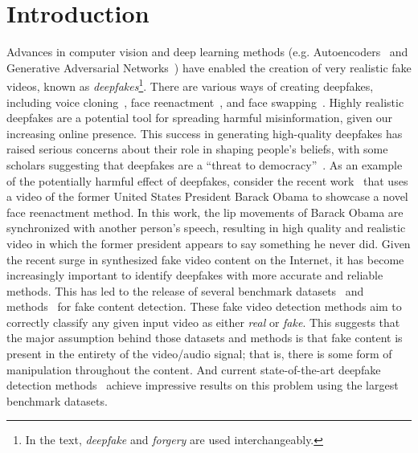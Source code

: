 \documentclass[conference, a4paper]{IEEEtran}
\makeatletter
\newcommand*{\eg}{e.g.\@\xspace}
\makeatother
\begin{document}
\section{Introduction}
\label{sec:introduction}
Advances in computer vision and deep learning methods (\eg Autoencoders~\cite{rumelhart_learning_1985} and Generative Adversarial Networks~\cite{goodfellow_generative_2020}) have enabled the creation of very realistic fake videos, known as \textit{deepfakes}\footnote{In the text, \textit{deepfake} and \textit{forgery} are used interchangeably.}. There are various ways of creating deepfakes, including voice cloning~\cite{wang_tacotron_2017, jia_transfer_2018}, face reenactment~\cite{tulyakov_mocogan_2018, prajwal_lip_2020}, and face swapping~\cite{korshunova_fast_2017, nirkin_fsgan_2019}. Highly realistic deepfakes are a potential tool for spreading harmful misinformation, given our increasing online presence. This success in generating high-quality deepfakes has raised serious concerns about their role in shaping people's beliefs, with some scholars suggesting that deepfakes are a ``threat to democracy''~\cite{schwartz_you_2018, brandon_there_2019, sample_what_2020, thomas_deepfakes_2020}. As an example of the potentially harmful effect of deepfakes, consider the recent work~\cite{thies_neural_2020} that uses a video of the former United States President Barack Obama to showcase a novel face reenactment method. In this work, the lip movements of Barack Obama are synchronized with another person's speech, resulting in high quality and realistic video in which the former president appears to say something he never did. Given the recent surge in synthesized fake video content on the Internet, it has become increasingly important to identify deepfakes with more accurate and reliable methods. This has led to the release of several benchmark datasets~\cite{korshunov_deepfakes_2018, rossler_faceforensics_2019, dolhansky_deepfake_2020} and methods~\cite{mirsky_creation_2021} for fake content detection. These fake video detection methods aim to correctly classify any given input video as either \textit{real} or \textit{fake}. This suggests that the major assumption behind those datasets and methods is that fake content is present in the entirety of the video/audio signal; that is, there is some form of manipulation throughout the content. And current state-of-the-art deepfake detection methods~\cite{coccomini_combining_2022, heo_deepfake_2021, wodajo_deepfake_2021} achieve impressive results on this problem using the largest benchmark datasets.
\end{document}
